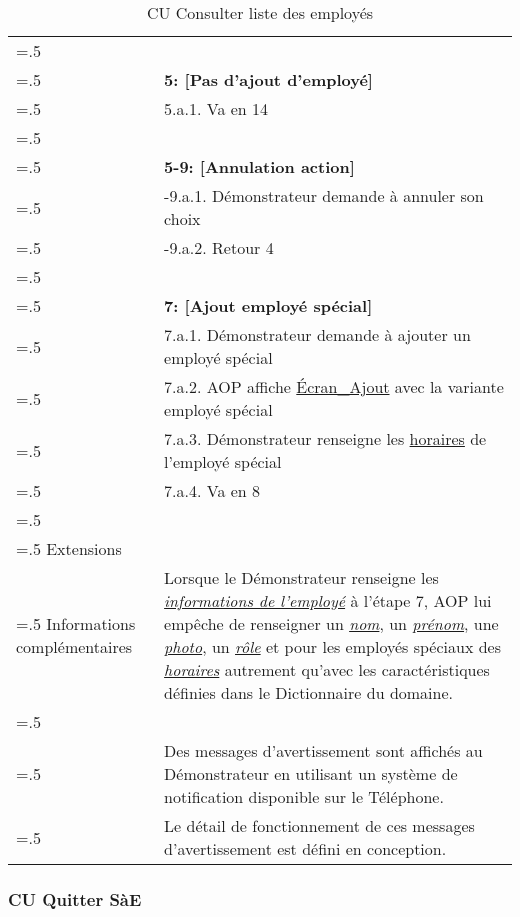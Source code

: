 \begin{table}[H]
  \centering
  \begin{tabularx}{\textwidth}{|>{\hsize=.5\hsize}X|>{\hsize=1.5\hsize}X|}
    \hline
    & \\
    & \textbf{5: [Pas d'ajout d'employé]} \\
    & 5.a.1. Va en 14 \\
    & \\
    & \textbf{5-9: [Annulation action]} \\ 
    & 5-9.a.1. Démonstrateur demande à annuler son choix \\
    & 5-9.a.2. Retour 4 \\
    & \\
    & \textbf{7: [Ajout employé spécial]} \\
    & 7.a.1. Démonstrateur demande à ajouter un employé spécial \\
    & 7.a.2. AOP affiche \hyperlink{EcranAjoutSpecial}{Écran\_Ajout} avec la variante employé spécial \\
    & 7.a.3. Démonstrateur renseigne les \hyperlink{hor}{horaires} de l'employé spécial \\
    & 7.a.4. Va en 8 \\
    & \\
    \hline
    Extensions & \\
    \hline
    Informations complémentaires
    & Lorsque le Démonstrateur renseigne les \hyperlink{caracEmploye}{\textit{informations de l'employé}} à l'étape 7, AOP lui empêche de renseigner un \hyperlink{nom}{\textit{nom}}, un \hyperlink{prenom}{\textit{prénom}}, une \hyperlink{photo}{\textit{photo}}, un \hyperlink{rol}{\textit{rôle}} et pour les employés spéciaux des \hyperlink{hor}{\textit{horaires}} autrement qu'avec les caractéristiques définies dans le Dictionnaire du domaine. \\
    & \\
    & Des messages d'avertissement sont affichés au Démonstrateur en utilisant un système de notification disponible sur le Téléphone. \\
    & Le détail de fonctionnement de ces messages d'avertissement est défini en conception. \\
    \hline
  \end{tabularx}
  \caption{CU Consulter liste des employés}
  \label{tableau-cu-modifier-liste-employes2}
\end{table}
\newpage
\subsubsection{CU Quitter SàE}

